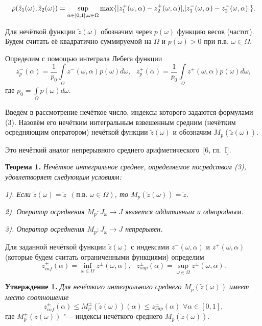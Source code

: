 \begin{equation*}
\rho(\tilde{z}_1(\omega), \tilde{z}_2(\omega)) = \sup\limits_{\alpha\in[0,1], \omega\in\Omega}\max\{|z_1^{+}(\omega, \alpha) - z_2^{+}(\omega, \alpha)|, $$$$|z_1^{-}(\omega, \alpha) - z_2^{-}(\omega, \alpha)|\}.
\end{equation*}




Для нечёткой функции $\tilde{z}(\omega)$ обозначим через $p(\omega)$ функцию весов (частот).  Будем считать её квадратично суммируемой на $\Omega$ и $p(\omega)>0$ при п.в. $\omega\in\Omega$.

Определим с помощью интеграла Лебега функции
\begin{equation}
z^{-}_{p}(\alpha) = \frac{1}{p_0}\int\limits_{\Omega}\!z^{-}(\omega, \alpha)p(\omega)d\omega,\,\,\,\,z^{+}_{p}(\alpha) = \frac{1}{p_0}\int\limits_{\Omega}\!z^{+}(\omega, \alpha)p(\omega)d\omega,
\end{equation}
где $p_0 = \int\limits_{\Omega}p(\omega)d\omega$.


Введём в рассмотрение нечёткое число, индексы которого задаются формулами (3). Назовём его нечётким интегральным взвешенным средним (нечётким осредняющим оператором) нечёткой функции $\tilde{z}(\omega)$ и обозначим $M_p(\tilde{z}(\omega))$.

Это нечёткий аналог непрерывного среднего арифметического~[6, гл.~{I}].


\textbf{Теорема 1.} \textit{Нечёткое интегральное среднее, определяемое посредством (3), удовлетворяет следующим условиям:}

\textit{1). Если $\tilde{z}(\omega) = \tilde{z}\,\,\,(\text{п.в.}\,\,\omega\in\Omega)$, то $M_p(\tilde{z}(\omega)) = \tilde{z}$.
}

\textit{2). Оператор осреднения $M_p: J_{\omega}\rightarrow J$ является аддитивным и однородным.
}

\textit{3). Оператор осреднения $M_p: J_{\omega}\rightarrow J$ непрерывен.
}


Для заданной нечёткой функции $\tilde{z}(\omega)$ с индексами $z^{-}(\omega, \alpha)$ и $z^{+}(\omega, \alpha)$ (которые будем считать ограниченными функциями) определим
$$
z_{inf}^{\pm}(\alpha)=\inf\limits_{\omega\in\Omega}z^{\pm}(\omega, \alpha),\,\,\,\,z_{sup}^{\pm}(\alpha)=\sup\limits_{\omega\in\Omega}z^{\pm}(\omega, \alpha).
$$

\textbf{Утверждение 1.} \textit{Для нечёткого интегрального среднего $M_p(\tilde{z}(\omega))$ имеет место соотношение }
$$
z_{inf}^{\pm}(\alpha)\leq M_p^{\pm}(\tilde{z}(\omega))(\alpha) \leq z_{sup}^{\pm}(\alpha)\,\,\forall\alpha\in[0, 1],
$$
где $M_p^{\pm}(\tilde{z}(\omega))$ "--- индексы нечёткого среднего $M_p(\tilde{z}(\omega))$.



